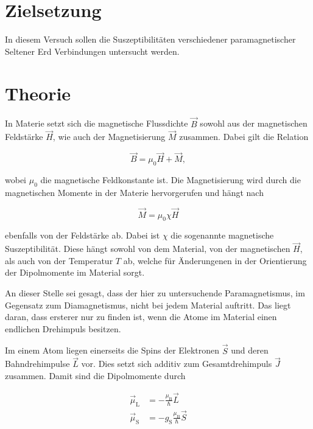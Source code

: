\section{Zielsetzung}

In diesem Versuch sollen die Suszeptibilitäten verschiedener paramagnetischer Seltener Erd Verbindungen untersucht werden.

\section{Theorie}
\label{sec:Theorie}

In Materie setzt sich die magnetische Flussdichte $\vec{B}$ sowohl aus der magnetischen Feldstärke $\vec{H}$, wie auch der Magnetisierung $\vec{M}$ zusammen.
Dabei gilt die Relation 

\begin{equation}
    \label{eqn:mag-allg}
    \vec{B} = \mu_0 \vec{H} + \vec{M},
\end{equation}

wobei $\mu_0$ die magnetische Feldkonstante ist. 
Die Magnetisierung wird durch die magnetischen Momente in der Materie hervorgerufen und hängt nach 

\begin{equation}
    \label{eqn:magnetisierung}
    \vec{M} = \mu_0 \chi \vec{H}
\end{equation}

ebenfalls von der Feldstärke ab.
Dabei ist $\chi$ die sogenannte magnetische Suszeptibilität. Diese hängt sowohl von dem Material, von der magnetischen $\vec{H}$, als auch von der Temperatur $T$ ab,
welche für Änderungenen in der Orientierung der Dipolmomente im Material sorgt.

An dieser Stelle sei gesagt, dass der hier zu untersuchende Paramagnetismus, im Gegensatz zum Diamagnetismus, nicht bei jedem Material auftritt.
Das liegt daran, dass ersterer nur zu finden ist, wenn die Atome im Material einen endlichen Drehimpuls besitzen.

Im einem Atom liegen einerseits die Spins der Elektronen $\vec{S}$ und deren Bahndrehimpulse $\vec{L}$ vor.
Dies setzt sich additiv zum Gesamtdrehimpuls $\vec{J}$ zusammen.
Damit sind die Dipolmomente durch

\begin{align}
    \vec{\mu}_\text{L} &= - \frac{\mu_\text{B}}{\hslash} \vec{L} \\
    \vec{\mu}_\text{S} &= - g_\text{S} \frac{\mu_\text{B}}{\hslash} \vec{S}
\end{align}

